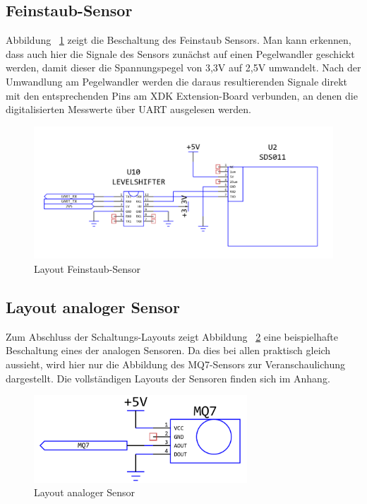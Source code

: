 \subsection{Feinstaub-Sensor}\label{subsec:Feinstaub-Sensor}
Abbildung ~\ref{fig:Layout_SDS011} zeigt die Beschaltung des Feinstaub Sensors. Man kann erkennen, dass auch hier die Signale des Sensors zunächst auf einen Pegelwandler geschickt werden, damit dieser die Spannungspegel von 3,3V auf 2,5V umwandelt. Nach der Umwandlung am Pegelwandler werden die daraus resultierenden Signale direkt mit den entsprechenden Pins am \acs{XDK} Extension-Board verbunden, an denen die digitalisierten Messwerte über \acs{UART} ausgelesen werden.
\begin{figure}[H]
	\includegraphics[width=\textwidth]{images/Layout_SDS011.png}	
	\caption{Layout Feinstaub-Sensor}
	\label{fig:Layout_SDS011}
\end{figure}
\subsection{Layout analoger Sensor}\label{subsec:Layout analoger Sensor}
Zum Abschluss der Schaltungs-Layouts zeigt Abbildung ~\ref{fig:Layout_Sensor_Example} eine beispielhafte Beschaltung eines der analogen Sensoren. Da dies bei allen praktisch gleich aussieht, wird hier nur die Abbildung des MQ7-Sensors zur Veranschaulichung dargestellt. Die vollständigen Layouts der Sensoren finden sich im Anhang.
\begin{figure}[H]
	\includegraphics[width=8cm]{images/Layout_Sensor_Example.png}	
	\caption{Layout analoger Sensor}
	\label{fig:Layout_Sensor_Example}
\end{figure}